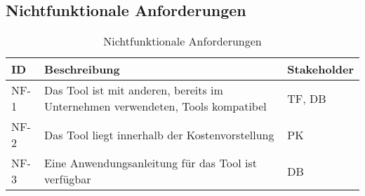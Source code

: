 \subsection{Nichtfunktionale Anforderungen}
\label{subsec:nichtfunktional}

\begin{table}[H]
    {
        \begin{tabularx}{\linewidth}{|C{1cm}|X|C{2cm}|}
            \hline
            ID
             & Beschreibung
             & Stakeholder
            \\
            \hline
            NF-1
             & Das Tool ist mit anderen, bereits im Unternehmen verwendeten, Tools kompatibel
             & TF, DB
            \\
            NF-2
             & Das Tool liegt innerhalb der Kostenvorstellung
             & PK
            \\
            NF-3
             & Eine Anwendungsanleitung für das Tool ist verfügbar
             & DB
            \\
            \hline
        \end{tabularx}
    }
    \caption{Nichtfunktionale Anforderungen}
    \label{tab:nichtfunktional}
\end{table}